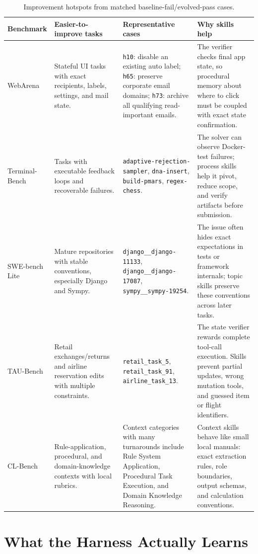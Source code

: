 \begin{table}[t]
\centering
\caption{Improvement hotspots from matched baseline-fail/evolved-pass cases.}
\label{tab:improvement-hotspots}
\small
\setlength{\tabcolsep}{3.5pt}
\begin{tabular}{p{2.0cm}p{3.2cm}p{4.3cm}p{4.0cm}}
\toprule
\textbf{Benchmark} & \textbf{Easier-to-improve tasks} &
\textbf{Representative cases} & \textbf{Why skills help} \\
\midrule
WebArena &
Stateful UI tasks with exact recipients, labels, settings, and mail state. &
\texttt{h10}: disable an existing auto label;
\texttt{h65}: preserve corporate email domains;
\texttt{h73}: archive all qualifying read-important emails. &
The verifier checks final app state, so procedural memory about where to click
must be coupled with exact state confirmation. \\
\midrule
Terminal-Bench &
Tasks with executable feedback loops and recoverable failures. &
\texttt{adaptive-rejection-sampler}, \texttt{dna-insert},
\texttt{build-pmars}, \texttt{regex-chess}. &
The solver can observe Docker-test failures; process skills help it pivot,
reduce scope, and verify artifacts before submission. \\
\midrule
SWE-bench Lite &
Mature repositories with stable conventions, especially Django and Sympy. &
\texttt{django\_\_django-11133}, \texttt{django\_\_django-17087},
\texttt{sympy\_\_sympy-19254}. &
The issue often hides exact expectations in tests or framework internals; topic
skills preserve these conventions across later tasks. \\
\midrule
TAU-Bench &
Retail exchanges/returns and airline reservation edits with multiple
constraints. &
\texttt{retail\_task\_5}, \texttt{retail\_task\_91},
\texttt{airline\_task\_13}. &
The state verifier rewards complete tool-call execution. Skills prevent
partial updates, wrong mutation tools, and guessed item or flight identifiers. \\
\midrule
CL-Bench &
Rule-application, procedural, and domain-knowledge contexts with local rubrics.
&
Context categories with many turnarounds include Rule System Application,
Procedural Task Execution, and Domain Knowledge Reasoning. &
Context skills behave like small local manuals: exact extraction rules, role
boundaries, output schemas, and calculation conventions. \\
\bottomrule
\end{tabular}
\end{table}

\section{What the Harness Actually Learns}\label{app:learned-skills}

